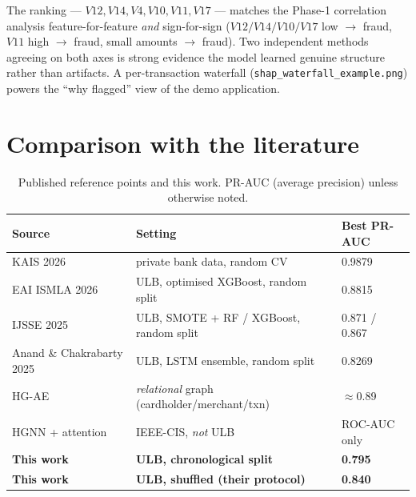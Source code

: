 \documentclass[11pt,a4paper]{article}
\newcommand{\code}[1]{\texttt{\small #1}}
\begin{document}
The ranking --- $V12, V14, V4, V10, V11, V17$ --- matches the Phase-1 correlation analysis
feature-for-feature \emph{and} sign-for-sign ($V12/V14/V10/V17$ low $\to$ fraud,
$V11$ high $\to$ fraud, small amounts $\to$ fraud). Two independent methods agreeing on both
axes is strong evidence the model learned genuine structure rather than artifacts. A per-transaction
waterfall (\code{shap\_waterfall\_example.png}) powers the
``why flagged'' view of the demo application.

\section{Comparison with the literature}
\label{sec:litcmp}

\begin{table}[h]
      \centering\small
      \caption{Published reference points and this work. PR-AUC (average precision) unless
      otherwise noted.}
      \label{tab:lit}
      \begin{tabularx}{\textwidth}{lXl}
            \toprule
            Source & Setting & Best PR-AUC\\
            \midrule
            KAIS 2026~\cite{kais2026} & private bank data, random CV & 0.9879\\
            EAI ISMLA 2026~\cite{eai2026} & ULB, optimised XGBoost, random split & 0.8815\\
            IJSSE 2025~\cite{ijsse2025} & ULB, SMOTE + RF / XGBoost, random split & 0.871 / 0.867\\
            Anand \& Chakrabarty 2025~\cite{anand2025} & ULB, LSTM ensemble, random split & 0.8269\\
            HG-AE~\cite{hgae2024} & \emph{relational} graph (cardholder/merchant/txn) & $\approx$0.89\\
            HGNN + attention~\cite{hgnn2025} & IEEE-CIS, \emph{not} ULB & ROC-AUC only\\
            \midrule
            \textbf{This work} & \textbf{ULB, chronological split} & \textbf{0.795}\\
            \textbf{This work} & \textbf{ULB, shuffled (their protocol)} & \textbf{0.840}\\
            \bottomrule
      \end{tabularx}
\end{table}
\end{document}
